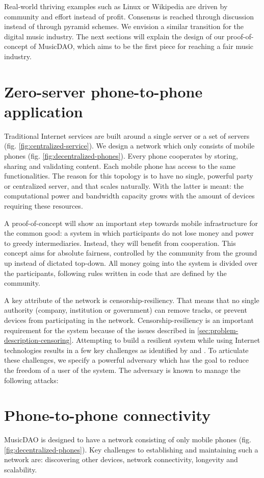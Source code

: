 Real-world thriving examples such as Linux or Wikipedia are driven by community and effort instead of profit. Consensus is reached through discussion instead of through pyramid schemes. We envision a similar transition for the digital music industry. The next sections will explain the design of our proof-of-concept of MusicDAO, which aims to be the first piece for reaching a fair music industry.

\section{Zero-server phone-to-phone application}
Traditional Internet services are built around a single server or a set of servers (fig. \ref{fig:centralized-service}). We design a network which only consists of mobile phones (fig. \ref{fig:decentralized-phones}). Every phone cooperates by storing, sharing and validating content. Each mobile phone has access to the same functionalities. The reason for this topology is to have no single, powerful party or centralized server, and that scales naturally. With the latter is meant: the computational power and bandwidth capacity grows with the amount of devices requiring these resources.

A proof-of-concept will show an important step towards mobile infrastructure for the common good: a system in which participants do not lose money and power to greedy intermediaries. Instead, they will benefit from cooperation. This concept aims for absolute fairness, controlled by the community from the ground up instead of dictated top-down. All money going into the system is divided over the participants, following rules written in code that are defined by the community.

A key attribute of the network is censorship-resiliency. That means that no single authority (company, institution or government) can remove tracks, or prevent devices from participating in the network. Censorship-resiliency is an important requirement for the system because of the issues described in \ref{sec:problem-description-censoring}. Attempting to build a resilient system while using Internet technologies results in a few key challenges as identified by \cite{pouwelse2012censorship} and \cite{di2014bypassing}. To articulate these challenges, we specify a powerful adversary which has the goal to reduce the freedom of a user of the system. The adversary is known to manage the following attacks:

\section{Phone-to-phone connectivity}
MusicDAO is designed to have a network consisting of only mobile phones (fig. \ref{fig:decentralized-phones}). Key challenges to establishing and maintaining such a network are: discovering other devices, network connectivity, longevity and scalability.

